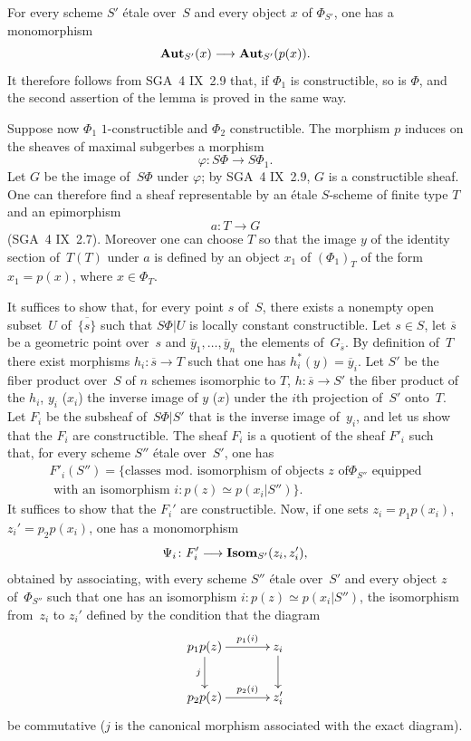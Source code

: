 For every scheme $S'$ \'etale over~$S$ and every object $x$ of
$\Phi_{S'}$, one has a monomorphism
$$
\SheafAut_{S'}(x)\to\SheafAut_{S'}(p(x)).
$$
It therefore follows from SGA~4 IX~2.9 that, if $\Phi_1$ is
constructible, so is $\Phi$, and the second
assertion of the lemma is proved in the same way.

Suppose now $\Phi_1$ $1$-constructible and $\Phi_2$
constructible. The morphism $p$ induces on the sheaves of
maximal subgerbes a morphism
$$
\varphi\colon S\Phi\to S\Phi_1.
$$
Let $G$ be the image of~$S\Phi$ under $\varphi$; by SGA~4 IX~2.9,
$G$ is a constructible sheaf. One can therefore find a sheaf
representable by an \'etale $S$-scheme of finite type $T$ and
an epimorphism
$$
a\colon T\to G
$$
(SGA~4 IX~2.7).
Moreover one can choose $T$ so that the image $y$ of the identity
section of~$T(T)$ under $a$ is defined by an object $x_1$ of
$(\Phi_1)_T$ of the form $x_1=p(x)$, where $x\in\Phi_T$.

It suffices to show that, for every point $s$ of~$S$, there exists a
nonempty open subset~$U$ of~$\overline{\{ s\} }$ such that $S\Phi|U$ is
locally constant constructible. Let $s\in S$, let $\overline{s}$ be a
geometric point over~$s$ and $\overline{y}_1,\dots,\overline{y}_n$ the elements of~$G_{\overline{s}}$. By
definition of~$T$ there exist morphisms
$h_i\colon\overline{s}\to T$ such that one has
$h_i^*(y)=\overline{y}_i$. Let $S'$ be the fiber product over~$S$ of
$n$ schemes isomorphic to $T$, $h\colon\overline{s}\to S'$ the
fiber product of the $h_i$, $y_i$ (\resp $x_i$) the inverse image of
$y$ (\resp $x$) under the $i$th projection of~$S'$ onto~$T$. Let
$F_i$ be the subsheaf of~$S\Phi |S'$ that is the inverse image of~$y_i$,
and let us show that the $F_i$ are constructible. The sheaf $F_i$ is
a quotient of the sheaf $F'_i$ such that, for every scheme $S''$
\'etale over~$S'$, one has
\begin{multline*}
F'_i(S'') = \{\text{classes mod.\ isomorphism of objects $z$ of
$\Phi_{S''}$ equipped}\\
\text{ with an isomorphism $i\colon p(z)\simeq p(x_i|S'')$}\}.
\end{multline*}
It suffices to show that the $F_i'$ are constructible. Now, if one
sets $z_i=p_1p(x_i)$, $z_i'=p_2p(x_i)$, one has a monomorphism
$$
\Psi_i\colon F'_i\to\SheafIsom_{S'}(z_i,z_i'),
$$
obtained by associating, with every scheme $S''$ \'etale over~$S'$ and
every object $z$ of~$\Phi_{S''}$ such that one has an isomorphism
$i\colon p(z)\simeq p(x_i|S'')$, the isomorphism from~$z_i$ to $z_i'$
defined by the condition that the diagram
$$
\xymatrix@C=1.2cm{
p_1p(z) \ar[r]^-{p_1(i)}\ar[d]_-j& z_i\ar[d]\\ p_2p(z) \ar[r]^-{p_2(i)}& z'_i
}
$$
be commutative ($j$ is the canonical morphism associated with the
exact diagram).

